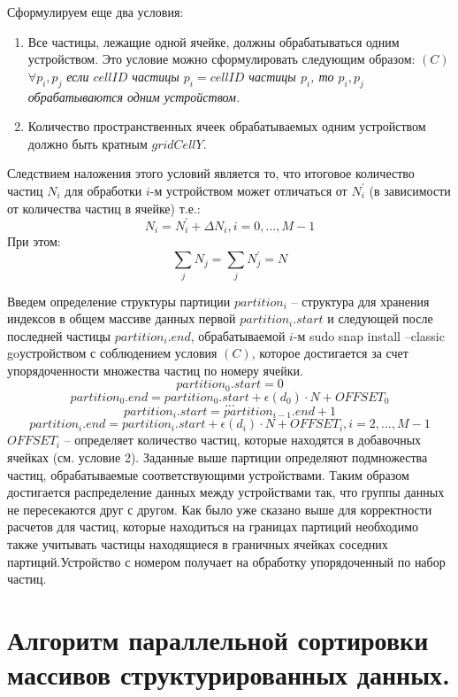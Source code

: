 Сформулируем еще два условия:
\noindent
\begin{enumerate}
  \item Все частицы, лежащие одной ячейке, должны обрабатываться одним устройством. Это условие можно сформулировать следующим образом:
        \((C)\) \(\forall p_i, p_j\) \textit{если \(cellID\) частицы \(p_i=cellID\) частицы \(p_i\), то \(p_i, p_j\) обрабатываются одним устройством.}
  \item Количество пространственных ячеек обрабатываемых одним устройством должно быть кратным \(gridCellY\).
\end{enumerate}

Следствием наложения этого условий является то, что итоговое количество частиц \(N_i \) для обработки \(i\)-м устройством  может отличаться от \(N_{i}^{'}\) (в зависимости от количества частиц в ячейке) т.е.:
\[
  N_i = N_{i}^{'}+\Delta N_i, i=0,..., M-1
\]
При этом:
\[
  \sum_{j} N_j = \sum_{j}N_{j}^{'}=N
\]

Введем определение структуры партиции \(partition_i\) – структура для хранения индексов в общем массиве данных первой \(partition_{i}.start\) и следующей после последней частицы \(partition_{i}.end\), обрабатываемой \(i\)-м sudo snap install --classic goустройством с соблюдением условия
\((C)\), которое достигается за счет упорядоченности множества частиц по номеру ячейки.
\[
  partition_{0}.start = 0
\]
\[
  partition_{0}.end = partition_{0}.start + \epsilon (d_0) \cdot N + OFFSET_0
\]
\[
  ...
\]
\[
  partition_{i}.start = partition_{i-1}.end + 1
\]
\[
  partition_{i}.end = partition_{i}.start + \epsilon (d_i) \cdot N + OFFSET_i, i=2,..., M - 1
\]
\(OFFSET_i\) – определяет количество частиц, которые находятся в добавочных ячейках (см. условие 2).
Заданные выше партиции определяют подмножества частиц, обрабатываемые соответствующими устройствами. Таким образом достигается распределение данных между устройствами так, что группы данных не пересекаются друг с другом. Как было уже сказано выше для корректности расчетов для частиц, которые находиться на границах партиций необходимо также учитывать частицы находящиеся в граничных ячейках соседних партиций.Устройство с номером  получает на обработку упорядоченный по  набор частиц. 

\section{Алгоритм параллельной сортировки массивов структурированных данных.}\label{sec:ch3/sect2}

